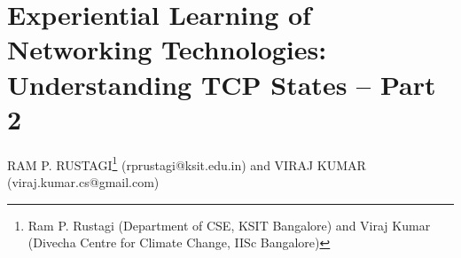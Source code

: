 \chapter{Experiential Learning of Networking Technologies: Understanding TCP States -- Part 2}

\begin{center}
\uppercase{Ram P. Rustagi}\footnote{Ram P. Rustagi (Department of CSE, KSIT Bangalore) and Viraj Kumar (Divecha Centre for Climate Change, IISc Bangalore)}  (rprustagi@ksit.edu.in) and \uppercase{Viraj Kumar} (viraj.kumar.cs@gmail.com)
\end{center}

\bigskip
\noindent{}

\newpage

